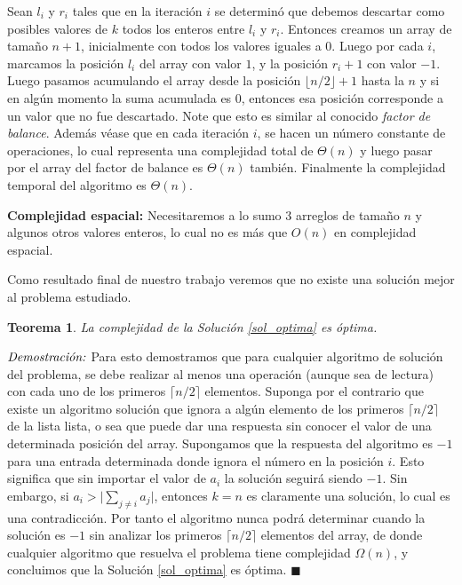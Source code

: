 \documentclass[10pt]{amsart}
\newtheorem{teo}[theorem]{Teorema}
\theoremstyle{definition}
\numberwithin{equation}{section}
\newcommand{\lqqd}{{\small $\blacksquare$}}
\newcommand{\Proof}[2]{{\vspace{1em} $\emph{Demostración:}$ \textbf{#1} #2 \lqqd \vspace{1em}}}
\begin{document}
		 Sean $l_i$ y $r_i$ tales que en la iteraci\'on $i$ se determin\'o que debemos descartar como posibles valores de $k$ todos los enteros entre $l_i$ y $r_i$. Entonces creamos un array de tama\~no $n + 1$, inicialmente con todos los valores iguales a $0$. Luego por cada $i$, marcamos la posici\'on $l_i$ del array con valor $1$, y la posici\'on $r_i + 1$ con valor $-1$. Luego pasamos acumulando el array desde la posici\'on $\lfloor n/2\rfloor + 1$ hasta la $n$ y si en alg\'un momento la suma acumulada es $0$, entonces esa posici\'on corresponde a un valor que no fue descartado. Note que esto es similar al conocido \emph{factor de balance}. Adem\'as v\'ease que en cada iteraci\'on $i$, se hacen un n\'umero constante de operaciones, lo cual representa una complejidad total de $\Theta(n)$ y luego pasar por el array del factor de balance es $\Theta(n)$ tambi\'en. Finalmente la complejidad temporal del algoritmo es $\Theta(n)$.
		 
		 \textbf{Complejidad espacial:} Necesitaremos a lo sumo $3$ arreglos de tama\~no $n$ y algunos otros valores enteros, lo cual no es m\'as que $O(n)$ en complejidad espacial. 
		 
		 
		 \medskip
		 Como resultado final de nuestro trabajo veremos que no existe una soluci\'on mejor al problema estudiado.
		 
		 \begin{teo}
		 	La complejidad de la Soluci\'on \ref{sol_optima} es \'optima.
		 \end{teo}
		 
		 \Proof{}{
		 	Para esto demostramos que para cualquier algoritmo de soluci\'on del problema, se debe realizar al menos una operaci\'on (aunque sea de lectura) con cada uno de los primeros $\lceil n / 2 \rceil$ elementos. Suponga por el contrario que existe un algoritmo soluci\'on que ignora a alg\'un elemento de los primeros $\lceil n / 2 \rceil $ de la lista lista, o sea que puede dar una respuesta sin conocer el valor de una determinada posici\'on del array. Supongamos que la respuesta del algoritmo es $-1$ para una entrada determinada donde ignora el n\'umero en la posici\'on $i$. Esto significa que sin importar el valor de $a_i$ la soluci\'on seguir\'a siendo $-1$. Sin embargo, si $a_i > \big| \sum_{j \neq i} a_j \big|$, entonces $k = n$ es claramente una soluci\'on, lo cual es una contradicci\'on. Por tanto el algoritmo nunca podr\'a determinar cuando la soluci\'on es $-1$ sin analizar los primeros $ \lceil n/2 \rceil $ elementos del array, de donde cualquier algoritmo que resuelva el problema tiene complejidad $\Omega(n)$, y concluimos que la Soluci\'on \ref{sol_optima} es \'optima.
		 }
		 
\end{document}
